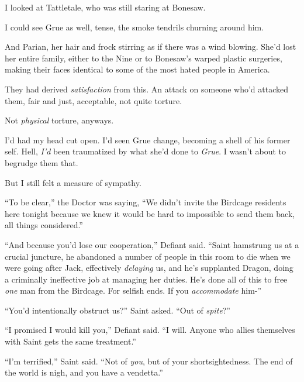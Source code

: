 I looked at Tattletale, who was still staring at Bonesaw.



I could see Grue as well, tense, the smoke tendrils churning around him.



And Parian, her hair and frock stirring as if there was a wind blowing.  She'd lost her entire family, either to the Nine or to Bonesaw's warped plastic surgeries, making their faces identical to some of the most hated people in America.



They had derived \emph{satisfaction} from this.  An attack on someone who'd attacked them, fair and just, acceptable, not quite torture.



Not \emph{physical} torture, anyways.



I'd had my head cut open.  I'd seen Grue change, becoming a shell of his former self.  Hell, \emph{I'd} been traumatized by what she'd done to \emph{Grue}.  I wasn't about to begrudge them that.



But I still felt a measure of sympathy.



``To be clear,'' the Doctor was saying, ``We didn't invite the Birdcage residents here tonight because we knew it would be hard to impossible to send them back, all things considered.''



``And because you'd lose our cooperation,'' Defiant said.  ``Saint hamstrung us at a crucial juncture, he abandoned a number of people in this room to die when we were going after Jack, effectively \emph{delaying} us, and he's supplanted Dragon, doing a criminally ineffective job at managing her duties.  He's done all of this to free \emph{one} man from the Birdcage.  For selfish ends.  If you \emph{accommodate} him-''



``You'd intentionally obstruct us?'' Saint asked.  ``Out of \emph{spite}?''



``I promised I would kill you,'' Defiant said.  ``I will.  Anyone who allies themselves with Saint gets the same treatment.''



``I'm terrified,'' Saint said.  ``Not of \emph{you}, but of your shortsightedness.  The end of the world is nigh, and you have a vendetta.''




